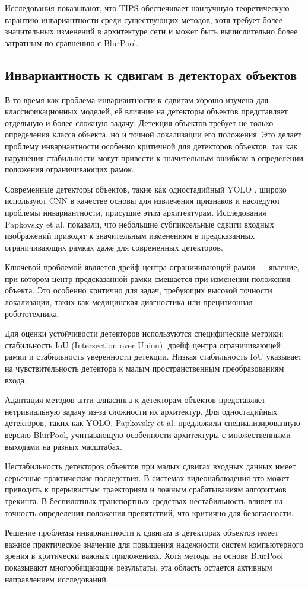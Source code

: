 Исследования показывают, что TIPS обеспечивает наилучшую теоретическую гарантию инвариантности среди существующих методов, хотя требует более значительных изменений в архитектуре сети и может быть вычислительно более затратным по сравнению с BlurPool.

\subsection{Инвариантность к сдвигам в детекторах объектов}
\label{review:detectors}

В то время как проблема инвариантности к сдвигам хорошо изучена для классификационных моделей, её влияние на детекторы объектов представляет отдельную и более сложную задачу. Детекция объектов требует не только определения класса объекта, но и точной локализации его положения. Это делает проблему инвариантности особенно критичной для детекторов объектов, так как нарушения стабильности могут привести к значительным ошибкам в определении положения ограничивающих рамок.

Современные детекторы объектов, такие как одностадийный YOLO \cite{redmon2016yolo}, широко используют CNN в качестве основы для извлечения признаков и наследуют проблемы инвариантности, присущие этим архитектурам. Исследования Papkovsky et al. \cite{papkovsky2023shift} показали, что небольшие субпиксельные сдвиги входных изображений приводят к значительным изменениям в предсказанных ограничивающих рамках даже для современных детекторов.

Ключевой проблемой является дрейф центра ограничивающей рамки — явление, при котором центр предсказанной рамки смещается при изменении положения объекта. Это особенно критично для задач, требующих высокой точности локализации, таких как медицинская диагностика или прецизионная робототехника.

Для оценки устойчивости детекторов используются специфические метрики: стабильность IoU (Intersection over Union), дрейф центра ограничивающей рамки и стабильность уверенности детекции. Низкая стабильность IoU указывает на чувствительность детектора к малым пространственным преобразованиям входа.

Адаптация методов анти-алиасинга к детекторам объектов представляет нетривиальную задачу из-за сложности их архитектур. Для одностадийных детекторов, таких как YOLO, Papkovsky et al. \cite{papkovsky2023shift} предложили специализированную версию BlurPool, учитывающую особенности архитектуры с множественными выходами на разных масштабах.

Нестабильность детекторов объектов при малых сдвигах входных данных имеет серьезные практические последствия. В системах видеонаблюдения это может приводить к прерывистым траекториям и ложным срабатываниям алгоритмов трекинга. В беспилотных транспортных средствах нестабильность влияет на точность определения положения препятствий, что критично для безопасности.

Решение проблемы инвариантности к сдвигам в детекторах объектов имеет важное практическое значение для повышения надежности систем компьютерного зрения в критически важных приложениях. Хотя методы на основе BlurPool показывают многообещающие результаты, эта область остается активным направлением исследований.

\newpage
